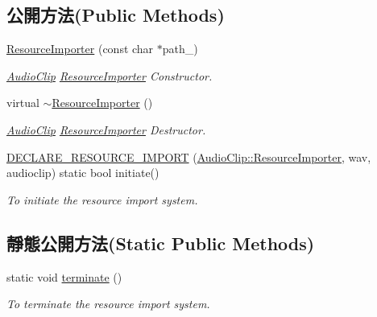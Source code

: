 \subsection*{公開方法(Public Methods)}
\begin{DoxyCompactItemize}
\item 
\hyperlink{class_magnum_1_1_audio_clip_1_1_resource_importer_ad1527f3ab8306160f52c8268d677216c}{Resource\+Importer} (const char $\ast$path\+\_\+)
\begin{DoxyCompactList}\small\item\em \hyperlink{class_magnum_1_1_audio_clip}{Audio\+Clip} \hyperlink{class_magnum_1_1_audio_clip_1_1_resource_importer}{Resource\+Importer} Constructor. \end{DoxyCompactList}\item 
virtual \hyperlink{class_magnum_1_1_audio_clip_1_1_resource_importer_a5460494b70300e8cf883294f60f745d1}{$\sim$\+Resource\+Importer} ()
\begin{DoxyCompactList}\small\item\em \hyperlink{class_magnum_1_1_audio_clip}{Audio\+Clip} \hyperlink{class_magnum_1_1_audio_clip_1_1_resource_importer}{Resource\+Importer} Destructor. \end{DoxyCompactList}\item 
\hyperlink{class_magnum_1_1_audio_clip_1_1_resource_importer_a6c1d10e4d9f3756419ee56e8a6e75a44}{D\+E\+C\+L\+A\+R\+E\+\_\+\+R\+E\+S\+O\+U\+R\+C\+E\+\_\+\+I\+M\+P\+O\+RT} (\hyperlink{class_magnum_1_1_audio_clip_1_1_resource_importer}{Audio\+Clip\+::\+Resource\+Importer}, wav, audioclip) static bool initiate()\hypertarget{class_magnum_1_1_audio_clip_1_1_resource_importer_a6c1d10e4d9f3756419ee56e8a6e75a44}{}\label{class_magnum_1_1_audio_clip_1_1_resource_importer_a6c1d10e4d9f3756419ee56e8a6e75a44}

\begin{DoxyCompactList}\small\item\em To initiate the resource import system. \end{DoxyCompactList}\end{DoxyCompactItemize}
\subsection*{靜態公開方法(Static Public Methods)}
\begin{DoxyCompactItemize}
\item 
static void \hyperlink{class_magnum_1_1_audio_clip_1_1_resource_importer_a16909505b5f3cbc9d45f8ccd1419a4b3}{terminate} ()\hypertarget{class_magnum_1_1_audio_clip_1_1_resource_importer_a16909505b5f3cbc9d45f8ccd1419a4b3}{}\label{class_magnum_1_1_audio_clip_1_1_resource_importer_a16909505b5f3cbc9d45f8ccd1419a4b3}

\begin{DoxyCompactList}\small\item\em To terminate the resource import system. \end{DoxyCompactList}\end{DoxyCompactItemize}
